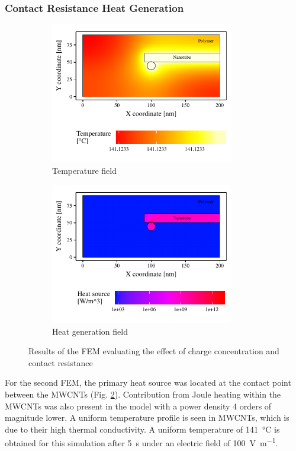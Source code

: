 \documentclass[11pt,review,times]{elsarticle}
\begin{document}
\subsubsection{Contact Resistance Heat Generation}
	\label{subsection:mechanism2}

\begin{figure}[htb]
	\centering
	\captionsetup{width=125mm}
	\begin{subfigure}{60mm}
		\centering
		\captionsetup{width=75mm}
		\includegraphics[width=80mm]{resultats_comsol_3D_temp}
		\caption{Temperature field}
		\label{fig:temp_3D}
	\end{subfigure}
	\begin{subfigure}{80mm}
		\centering
		\captionsetup{width=75mm}
		\includegraphics[width=80mm]{resultats_comsol_3D_puissance_log}
		\caption{Heat generation field}
		\label{fig:heat_3D}
	\end{subfigure}
	\caption{Results of the FEM evaluating the effect of charge concentration and contact resistance}
	\label{fig:results_3D}
\end{figure}

For the second FEM, the primary heat source was located at the contact point between the MWCNTs (Fig. \ref{fig:heat_3D}). 
Contribution from Joule heating within the MWCNTs was also present in the model with a power density 4 orders of magnitude lower. 
A uniform temperature profile is seen in MWCNTs, which is due to their high thermal conductivity. 
A uniform temperature of \SI{141}{\celsius} is obtained for this simulation after \SI{5}{\second} under an electric field of \SI{100}{\volt\per\metre}. 
\end{document}

